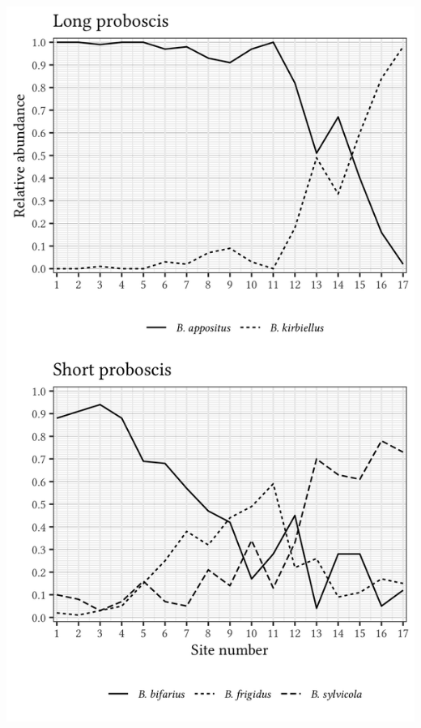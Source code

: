 \documentclass[12pt, hidelinks]{exam}
\begin{document}
\begin{questions}
\label{fig:relative_abundance}
\ifprintanswers
	\includegraphics[height=\textheight]{gothic_relative_abundance_key}
\else

\end{questions}
\end{document}
